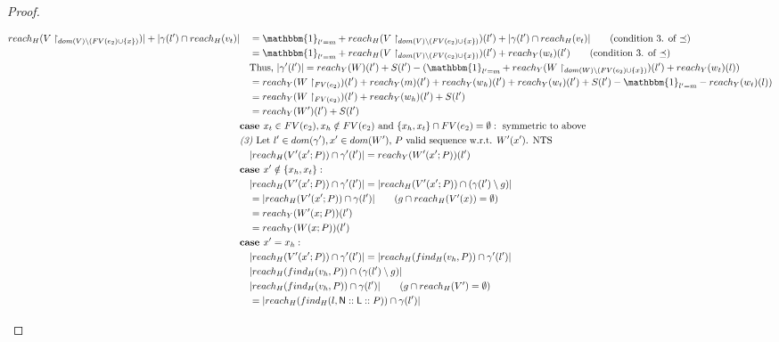 \documentclass{easychair}
\newcommand{\ms}[1]{\ensuremath{\mathsf{#1}}}
\theoremstyle{definition}
\begin{document}
\begin{proof}
\begin{description}
\begin{align*}
		reach_H(V\restriction_{dom(V)\setminus (FV(e_2)\cup \{x\})})| + |\gamma(l') \cap reach_H(v_t)|
		&\quad = \mathbbm{1}_{l' = m} + reach_H(V\restriction_{dom(V)\setminus (FV(e_2)\cup \{x\})})(l')
			+ |\gamma(l') \cap reach_H(v_t)| \tag{condition 3. of $\preceq$}\\
		&\quad = \mathbbm{1}_{l' = m} + reach_H(V\restriction_{dom(V)\setminus (FV(e_2)\cup \{x\})})(l')
			+ reach_Y(w_t)(l') \tag{condition 3. of $\preceq$}\\
		&\quad \text{Thus, } |\gamma'(l')| = 
			reach_Y(W)(l') + S(l') - (\mathbbm{1}_{l' = m}
				+ reach_Y(W\restriction_{dom(W)\setminus (FV(e_2) \cup \{x\})})(l') + reach_Y(w_t)(l))\\
		&\quad = reach_Y(W\restriction_{FV(e_2)})(l') + 
			reach_Y(m)(l') + reach_Y(w_h)(l') + reach_Y(w_t)(l') + S(l') - \mathbbm{1}_{l' = m} 
				- reach_Y(w_t)(l)) \\
		&\quad = reach_Y(W\restriction_{FV(e_2)})(l') + 
			reach_Y(w_h)(l') + S(l')\\
		&\quad = reach_Y(W')(l') +  S(l')\\
		&\textbf{case } x_t \in FV(e_2), x_h \notin FV(e_2) \text{ and } 
			\{x_h,x_t\} \cap FV(e_2) = \emptyset: \text{ symmetric to above }\\
		&\emph{(3) } \text{Let $l' \in dom(\gamma'), x' \in dom(W')$, 
			$P$ valid sequence w.r.t. $W'(x')$. NTS }\\ 
		&\quad|reach_{H}(V'(x';P)) \cap \gamma'(l')| = reach_{Y}(W'(x';P))(l')\\ 
		&\textbf{case } x' \notin \{x_h,x_t\}:\\
		&\quad |reach_{H}(V'(x';P)) \cap \gamma'(l')| = 
			|reach_{H}(V'(x';P)) \cap (\gamma(l')\setminus g)| \\
		&\quad = |reach_{H}(V'(x';P)) \cap \gamma(l')| \tag{$g \cap reach_H(V'(x)) = \emptyset$}\\ 
		&\quad = reach_Y(W'(x;P))(l') \\
		&\quad = reach_Y(W(x;P))(l') \\
		&\textbf{case } x' = x_h:\\
		&\quad |reach_{H}(V'(x';P)) \cap \gamma'(l')| = |reach_{H}(find_H(v_h,P)) \cap \gamma'(l')|\\
		&\quad |reach_{H}(find_H(v_h,P)) \cap (\gamma(l')\setminus g)|\\
		&\quad |reach_{H}(find_H(v_h,P)) \cap \gamma(l')| \tag{$g \cap reach_H(V') = \emptyset$}\\
		&\quad = |reach_{H}(find_H(l,\ms{N}::\ms{L}::P)) \cap \gamma(l')|\\

\end{align*}
\end{description}
\end{proof}
\end{document}
